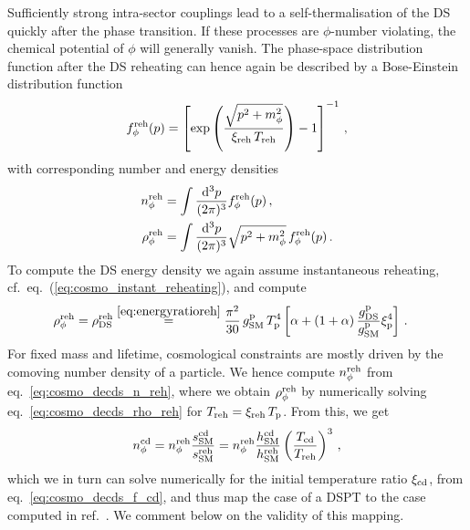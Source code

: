 	Sufficiently strong intra-sector couplings lead to a self-thermalisation of the \ac{DS} quickly after the phase transition. If these processes are $\phi$-number violating, the chemical potential of $\phi$ will generally vanish. The phase-space distribution function after the \ac{DS} reheating can hence again be described by a Bose-Einstein distribution function
	\begin{align}
		f_\phi^{\text{reh}} (p)  = \left[\exp \left(\frac{\sqrt{p^2 + m_\phi^2}}{\xi_{\text{reh}} \,  T_{\text{reh}}}\right) -1\right]^{-1} \,,\label{eq:fphi_reh}
	\end{align}
	with corresponding number and energy densities
	\begin{align}
		n_\phi^{\text{reh}} &= \int \frac{\mathrm{d}^3 p}{(2 \pi)^3} f_\phi^{\text{reh}} (p)\,,\label{eq:cosmo_decds_n_reh} \\
		\rho_\phi^{\text{reh}} &= \int \frac{\mathrm{d}^3 p}{(2 \pi)^3} \sqrt{p^2 + m_\phi^2} \, f_\phi^{\text{reh}} (p)\,. \label{eq:cosmo_decds_rho_reh}
	\end{align}
	To compute the DS energy density we again assume instantaneous reheating, cf.~eq.~(\ref{eq:cosmo_instant_reheating}),  and compute
	\begin{align}
		\rho_\phi^{\text{reh}} = \rho_{\text{DS}}^{\text{reh}} &\stackrel{\eqref{eq:energyratioreh}}{=} \frac{\pi^2}{30} \, g_{\text{SM}}^{\text{p}} \, T_{\text{p}}^4  \left[\alpha +  \left(1 + \alpha\right)\frac{g_{\text{DS}}^{\text{p}}}{g_{\text{SM}}^{\text{p}}} \xi_{\text{p}}^4\right] \, . \label{eq:dec_ds_rho_phi_reh}
	\end{align}
	For fixed mass and lifetime, cosmological constraints are mostly driven by the comoving number density of a particle. 
	We hence compute $n_\phi^{\text{reh}}$ from eq.~\eqref{eq:cosmo_decds_n_reh}, where we obtain $\rho_\phi^{\text{reh}}$ by numerically solving eq.~\eqref{eq:cosmo_decds_rho_reh} for $T_{\text{reh}} = \xi_{\text{reh}} \, T_{\text{p}}$. From this, we get
	\begin{align}
		n_\phi^\mathrm{cd} = n_\phi^{\text{reh}} \frac{s_{\text{SM}}^\mathrm{cd}}{s_{\text{SM}}^{\text{reh}}} = n_\phi^{\text{reh}} \frac{h_{\text{SM}}^\mathrm{cd}}{h_{\text{SM}}^{\text{reh}}} \left( \frac{T_\mathrm{cd}}{T_{\text{reh}}} \right)^3\,, \label{eq:dec_ds_mapping}
	\end{align}
	which we in turn can solve numerically for the initial temperature ratio $\xi_{\text{cd}}$, from eq.~\eqref{eq:cosmo_decds_f_cd}, and thus map the case of a \ac{DSPT} to the case computed in ref.~\cite{Depta:2020zbh}. We comment below on the validity of this mapping.
	
